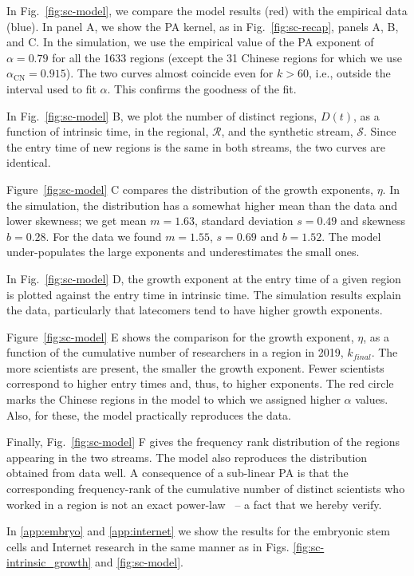 \documentclass[draft,final]{vutinfth} %
\begin{document}
In Fig.~\ref{fig:sc-model}, we compare the model results (red) with the empirical data (blue). In panel A, we show the PA kernel, as in Fig.~\ref{fig:sc-recap}, panels A, B, and C. 
In the simulation, we use the empirical value of the PA exponent of $\alpha=0.79$ for all the 1633 regions (except the 31 Chinese regions for which we use $\alpha_\mathrm{CN}=0.915$). The two curves almost coincide even for $k>60$, i.e., outside the interval used to fit $\alpha$. This confirms the goodness of the fit.

In Fig.~\ref{fig:sc-model} B, we plot the  number of distinct regions, $D(t)$, as a function of intrinsic time, in the regional, $\mathcal R$, and the synthetic stream, $\mathcal S$. Since the entry time of new regions is the same in both streams, the two curves are identical.

Figure~\ref{fig:sc-model} C compares the distribution of the growth exponents, $\eta$. 
In the simulation, the distribution has a somewhat higher mean than the data and lower skewness; we get mean $m = 1.63$, standard deviation $s=0.49$ and skewness $b=0.28$. 
For the data we found $m=1.55$, $s=0.69$ and $b=1.52$. 
The model under-populates the large exponents and underestimates the small ones.


In Fig.~\ref{fig:sc-model} D, the growth exponent at the entry time of a given region is plotted against the entry time in intrinsic time. The simulation results explain the data, particularly that latecomers tend to have higher growth exponents. 

Figure~\ref{fig:sc-model} E shows the comparison for the growth exponent, $\eta$, as a function of the cumulative number of researchers in a region in 2019, $k_{ final}$. The more scientists are present, the smaller the growth exponent. Fewer scientists correspond to higher entry times and, thus, to higher exponents. The red circle marks the Chinese regions in the model to which we assigned higher $\alpha$ values. Also, for these, the model practically reproduces the data. 

Finally, Fig.~\ref{fig:sc-model} F gives the frequency rank distribution of the regions appearing in the two streams. The model also reproduces the distribution obtained from data well. A consequence of a sub-linear PA is that the corresponding frequency-rank of the cumulative number of distinct scientists who worked in a region is not an exact  power-law~\cite{Krapivsky00} -- a fact that we hereby verify. 

In \ref{app:embryo} and \ref{app:internet} we show the results for the embryonic stem cells and Internet research in the same manner as in Figs. \ref{fig:sc-intrinsic_growth} and \ref{fig:sc-model}.
\end{document}
